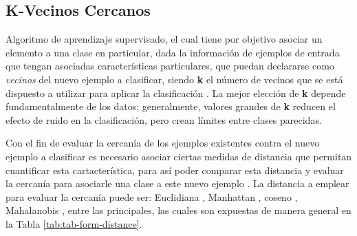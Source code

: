 \subsection{K-Vecinos Cercanos}

Algoritmo de aprendizaje supervisado, el cual tiene por objetivo asociar un elemento a una clase en particular, dada la información de ejemplos de entrada que tengan asociadas características particulares, que puedan declararse como \textit{vecinos} del nuevo ejemplo a clasificar, siendo \textbf{k} el número de vecinos que se está dispuesto a utilizar para aplicar la clasificación \cite{6313426}. La mejor elección de \textbf{k} depende fundamentalmente de los datos; generalmente, valores grandes de \textbf{k} reducen el efecto de ruido en la clasificación, pero crean límites entre clases parecidas.

Con el fin de evaluar la cercanía de los ejemplos existentes contra el nuevo ejemplo a clasificar es necesario asociar ciertas medidas de distancia que permitan cuantificar esta cartacterística, para así poder comparar esta distancia y evaluar la cercanía para asociarle una clase a este nuevo ejemplo \cite{5408784}. La distancia a emplear para evaluar la cercanía puede ser: Euclidiana \cite{DANIELSSON1980227}, Manhattan \cite{PERLIBAKAS2004711}, coseno \cite{LIAO20155328}, Mahalanobis \cite{DEMAESSCHALCK20001}, entre las principales, las cuales son expuestas de manera general en la Tabla \ref{tab:tab-form-distance}.

